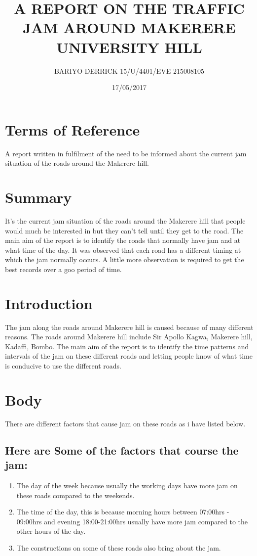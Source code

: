\documentclass[options]{article}
\begin{document}
\title{A REPORT ON THE TRAFFIC JAM AROUND MAKERERE UNIVERSITY HILL}
\author{BARIYO DERRICK
15/U/4401/EVE
215008105}
\date{17/05/2017}
\maketitle

\section{\textbf{Terms of Reference}}
A report written in fulfilment of the need to be informed about the current jam situation of the roads around the Makerere hill.

\section{\textbf{Summary}} 
It’s the current jam situation of the roads around the Makerere hill that people would much be interested in but they can’t tell until they get to the road. The main aim of the report is to identify the roads that normally have jam and at what time of the day.
It was observed that each road has a different timing at which the jam normally occurs. A little more observation is required to get the best records over a goo period of time.


\section{\textbf{Introduction}} 
The jam along the roads around Makerere hill is caused because of many different reasons. The roads around Makerere hill include Sir Apollo Kagwa, Makerere hill, Kadaffi, Bombo.
The main aim of the report is to identify the time patterns and intervals of the jam on these different roads and letting people know of what time is conducive to use the different roads.


\section{\textbf{Body}} 
There are different factors that cause jam on these roads as i have listed below.
 \subsection{\textbf{Here are Some of the factors that course the jam:}}  

\begin{enumerate}
\item The day of the week because usually the working days have more jam on these roads compared to the weekends.
\item The time of the day, this is because morning hours between 07:00hrs - 09:00hrs and evening 18:00-21:00hrs   usually have more jam compared to the other hours of the day.
\item The constructions on some of these roads also bring about the jam.
\end{enumerate}
\end{document}
